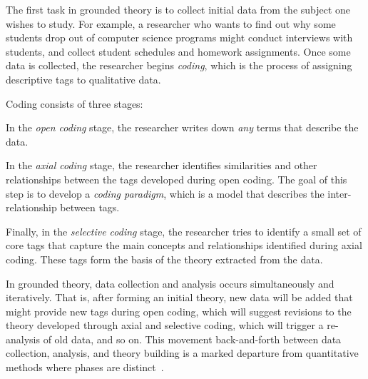 \documentclass[sigconf]{acmart}
\begin{document}
The first task in grounded theory is to collect initial data from the subject
one wishes to study. For example, a researcher who wants to find out why some
students drop out of computer science programs might conduct interviews with
students, and collect student schedules and homework assignments.
%
Once some data is collected, the researcher begins \emph{coding}, which is the
process of assigning descriptive tags to qualitative data.


Coding consists of three stages:
%
\begin{enumerate*}
%
\item In the \emph{open coding} stage, the researcher writes down \emph{any}
terms that describe the data.
%
\item In the \emph{axial coding} stage, the researcher identifies similarities
and other relationships between the tags developed during open coding. The goal
of this step is to develop a \emph{coding paradigm}, which is a model that
describes the inter-relationship between tags.
%
\item Finally, in the \emph{selective coding} stage, the researcher tries to
identify a small set of core tags that capture the main concepts and
relationships identified during axial coding. These tags form the basis of the
theory extracted from the data.
%
\end{enumerate*}


In grounded theory, data collection and analysis occurs simultaneously and
iteratively. That is, after forming an initial theory, new data will be added
that might provide new tags during open coding, which will suggest revisions to
the theory developed through axial and selective coding, which will trigger a
re-analysis of old data, and so on.
%
This movement back-and-forth between data collection, analysis, and theory
building is a marked departure from quantitative methods where phases are
distinct~\cite{Strauss67discoveryof}.
\end{document}
